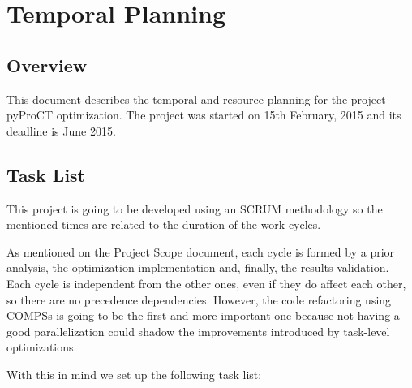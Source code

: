 
  
\chapter{Temporal Planning}
\label{sec:temporal_planning}

\section{Overview}

This document describes the temporal and resource planning for the project pyProCT optimization. The project was started on 15th February, 2015 and its deadline is June 2015.

\section{Task List}

This project is going to be developed using an SCRUM methodology so the mentioned times are related to the duration of the work cycles. 

As mentioned on the Project Scope document, each cycle is formed by a prior analysis, the optimization implementation and, finally, the results validation. Each cycle is independent from the other ones, even if they do affect each other, so there are no precedence dependencies. However, the code refactoring using COMPSs is going to be the first and more important one because not having a good parallelization could shadow the improvements introduced by task-level optimizations. 

With this in mind we set up the following task list:

